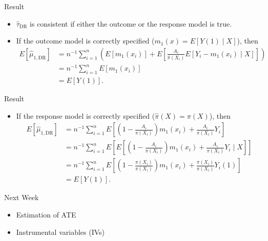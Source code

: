 \documentclass[handout]{beamer} %
\begin{document}
\begin{frame}{Result}

\begin{itemize}
    \item $\hat \tau_{\text{DR}}$ is consistent if either the outcome or the response
    model is true.
    \item If the outcome model is correctly specified ($m_1(x) = E[Y(1) \mid X]$), then
    \begin{align*}
    E[\hat \mu_{1, \text{DR}}] 
    &=  n^{-1} \sum_{i = 1}^n \left(E[m_1(x_i)] + E\left[\frac{A_i}{\hat \pi(X_i)} E[Y_i - m_1(x_i) \mid X]\right] \right)\\
    &=  n^{-1} \sum_{i = 1}^n E[m_1(x_i)]\\
    &=  E[Y(1)].
    \end{align*}
\end{itemize}

\end{frame}

\begin{frame}{Result}

\begin{itemize}
    \item If the response model is correctly specified ($\hat \pi(X) = \pi(X)$), then
    \begin{align*}
    E[\hat \mu_{1, \text{DR}}] 
    &=  n^{-1} \sum_{i = 1}^n E\left[\left(1 - \frac{A_i}{\pi(X_i)}\right)m_1(x_i) 
    + \frac{A_i}{\pi(X_i)}Y_i\right]\\
    &=  n^{-1} \sum_{i = 1}^n E\left[E\left[\left(1 - \frac{A_i}{\pi(X_i)}\right)m_1(x_i) 
    + \frac{A_i}{\pi(X_i)}Y_i\mid X\right]\right]\\
    &=  n^{-1} \sum_{i = 1}^n E\left[\left(1 - \frac{\pi(X_i)}{\pi(X_i)}\right)m_1(x_i) 
    + \frac{\pi(X_i)}{\pi(X_i)}Y_i(1)\right]\\
    &= E[Y(1)].
    \end{align*}
\end{itemize}
    
\end{frame}

\begin{frame}{Next Week}

\begin{itemize}
    \item Estimation of ATE
    \item Instrumental variables (IVs)
\end{itemize}

\end{frame}
\end{document}

